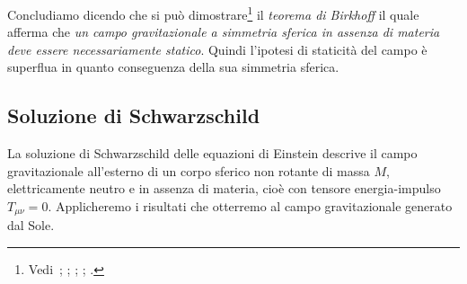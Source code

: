 Concludiamo dicendo che si può
dimostrare\footnote{Vedi~\textcite[390-393]{landau:campi};
  \textcite[843-844]{misner:gravitation};
  \textcite[337-340]{ohanian:gravitazione};
  \textcite[166-169]{straumann:general};
  \textcite[335-337]{weinberg:gravitation}.}  il \emph{teorema di Birkhoff}
 il quale afferma che \emph{un campo gravitazionale a
  simmetria sferica in assenza di materia deve essere necessariamente
  statico}. Quindi l'ipotesi di staticità del campo è superflua in quanto
conseguenza della sua simmetria sferica.

\subsection{Soluzione di Schwarzschild}
\label{sec:metrica-schwarzschild}

La soluzione di Schwarzschild delle equazioni di Einstein descrive il campo
gravitazionale all'esterno di un corpo sferico non rotante di massa $M$,
elettricamente neutro e in assenza di materia, cioè con tensore energia-impulso
$T_{\mu\nu} = 0$.  Applicheremo i risultati che otterremo al campo
gravitazionale generato dal Sole.

